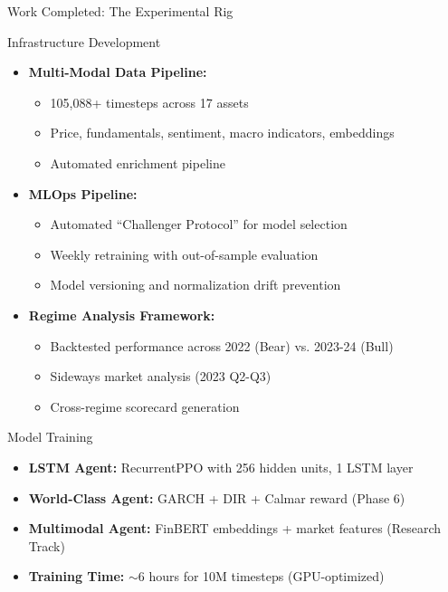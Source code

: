 \documentclass[aspectratio=169]{beamer}
\begin{document}
\begin{frame}{Work Completed: The Experimental Rig}
\begin{block}{Infrastructure Development}
\begin{itemize}
    \item \textbf{Multi-Modal Data Pipeline:}
    \begin{itemize}
        \item 105,088+ timesteps across 17 assets
        \item Price, fundamentals, sentiment, macro indicators, embeddings
        \item Automated enrichment pipeline
    \end{itemize}
    \item \textbf{MLOps Pipeline:}
    \begin{itemize}
        \item Automated ``Challenger Protocol'' for model selection
        \item Weekly retraining with out-of-sample evaluation
        \item Model versioning and normalization drift prevention
    \end{itemize}
    \item \textbf{Regime Analysis Framework:}
    \begin{itemize}
        \item Backtested performance across 2022 (Bear) vs. 2023-24 (Bull)
        \item Sideways market analysis (2023 Q2-Q3)
        \item Cross-regime scorecard generation
    \end{itemize}
\end{itemize}
\end{block}

\vspace{0.3cm}

\begin{block}{Model Training}
\begin{itemize}
    \item \textbf{LSTM Agent:} RecurrentPPO with 256 hidden units, 1 LSTM layer
    \item \textbf{World-Class Agent:} GARCH + DIR + Calmar reward (Phase 6)
    \item \textbf{Multimodal Agent:} FinBERT embeddings + market features (Research Track)
    \item \textbf{Training Time:} $\sim$6 hours for 10M timesteps (GPU-optimized)
\end{itemize}
\end{block}
\end{frame}
\end{document}
